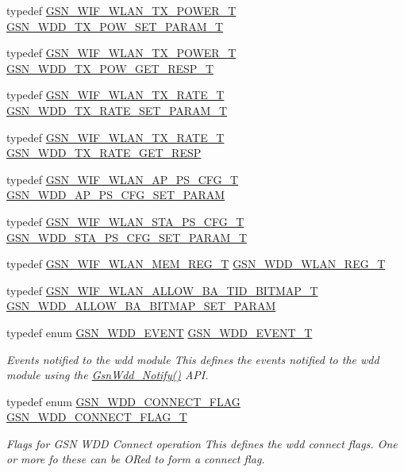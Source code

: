 \begin{DoxyCompactItemize}
typedef \hyperlink{a00408}{GSN\_\-WIF\_\-WLAN\_\-TX\_\-POWER\_\-T} \hyperlink{a00603_adbd195fb1038147499991fd7286b8c4c}{GSN\_\-WDD\_\-TX\_\-POW\_\-SET\_\-PARAM\_\-T}
\item 
typedef \hyperlink{a00408}{GSN\_\-WIF\_\-WLAN\_\-TX\_\-POWER\_\-T} \hyperlink{a00603_a18054aae33f811d29ce76060bf51e0f4}{GSN\_\-WDD\_\-TX\_\-POW\_\-GET\_\-RESP\_\-T}
\item 
typedef \hyperlink{a00409}{GSN\_\-WIF\_\-WLAN\_\-TX\_\-RATE\_\-T} \hyperlink{a00603_afcf91e1f003aac3078c1642f50f665c1}{GSN\_\-WDD\_\-TX\_\-RATE\_\-SET\_\-PARAM\_\-T}
\item 
typedef \hyperlink{a00409}{GSN\_\-WIF\_\-WLAN\_\-TX\_\-RATE\_\-T} \hyperlink{a00603_a0d7e87cd1ff0f897f58bb1c556ee7e4c}{GSN\_\-WDD\_\-TX\_\-RATE\_\-GET\_\-RESP}
\item 
typedef \hyperlink{a00368}{GSN\_\-WIF\_\-WLAN\_\-AP\_\-PS\_\-CFG\_\-T} \hyperlink{a00603_a7dc57c477301af9fb7424aa7cd500899}{GSN\_\-WDD\_\-AP\_\-PS\_\-CFG\_\-SET\_\-PARAM}
\item 
typedef \hyperlink{a00403}{GSN\_\-WIF\_\-WLAN\_\-STA\_\-PS\_\-CFG\_\-T} \hyperlink{a00603_aaebb85d67e7b45db59b7608cc1ac8ad0}{GSN\_\-WDD\_\-STA\_\-PS\_\-CFG\_\-SET\_\-PARAM\_\-T}
\item 
typedef \hyperlink{a00390}{GSN\_\-WIF\_\-WLAN\_\-MEM\_\-REG\_\-T} \hyperlink{a00603_a398cf6ae18e42fbe90a94ba03ef55230}{GSN\_\-WDD\_\-WLAN\_\-REG\_\-T}
\item 
typedef \hyperlink{a00365}{GSN\_\-WIF\_\-WLAN\_\-ALLOW\_\-BA\_\-TID\_\-BITMAP\_\-T} \hyperlink{a00603_afa9ab8eb88c695b390fd27c68bfdfefa}{GSN\_\-WDD\_\-ALLOW\_\-BA\_\-BITMAP\_\-SET\_\-PARAM}
\item 
typedef enum \hyperlink{a00677_ga1ff070ddd12f2dfd9bc0e26f84b4888c}{GSN\_\-WDD\_\-EVENT} \hyperlink{a00677_ga82734573aab1decd3ffd115af490f892}{GSN\_\-WDD\_\-EVENT\_\-T}
\begin{DoxyCompactList}\small\item\em Events notified to the wdd module This defines the events notified to the wdd module using the \hyperlink{a00677_ga3b57a234af35c0dc77fa3760a2f3f07f}{GsnWdd\_\-Notify()} API. \end{DoxyCompactList}\item 
typedef enum \hyperlink{a00677_ga2846a7c5251eb6332e71299cef92d003}{GSN\_\-WDD\_\-CONNECT\_\-FLAG} \hyperlink{a00677_ga3a599f8d47bbbf9108f9156cddf9bd4b}{GSN\_\-WDD\_\-CONNECT\_\-FLAG\_\-T}
\begin{DoxyCompactList}\small\item\em Flags for GSN WDD Connect operation This defines the wdd connect flags. One or more fo these can be ORed to form a connect flag. \end{DoxyCompactList}\item 

\end{DoxyCompactItemize}

